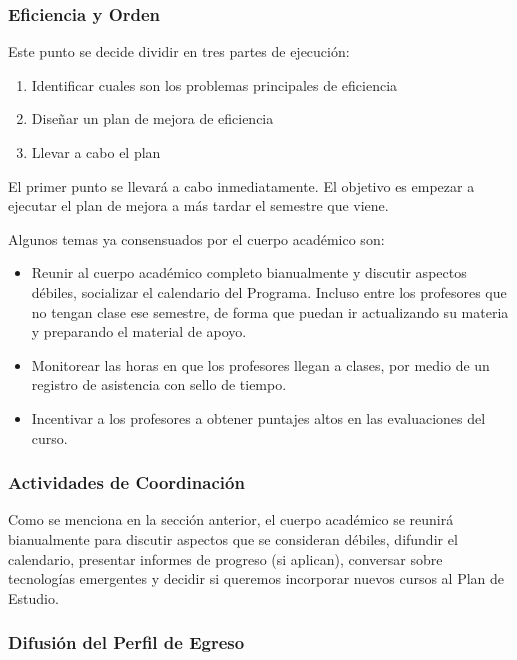 \subsubsection{Eficiencia y Orden}
\label{eficiencia_orden}

Este punto se decide dividir en tres partes de ejecución:

\begin{enumerate}
\item Identificar cuales son los problemas principales de eficiencia
\item Diseñar un plan de mejora de eficiencia
\item Llevar a cabo el plan 
\end{enumerate}

El primer punto se llevará a cabo inmediatamente. El objetivo es empezar a ejecutar el plan de mejora a más tardar el semestre que viene.

Algunos temas ya consensuados por el cuerpo académico son: 

\begin{itemize}
\item Reunir al cuerpo académico completo bianualmente y discutir aspectos débiles, socializar el calendario del Programa. Incluso entre los profesores que no tengan clase ese semestre, de forma que puedan ir actualizando su materia y preparando el material de apoyo.
\item Monitorear las horas en que los profesores llegan a clases, por medio de un registro de asistencia con sello de tiempo.
\item Incentivar a los profesores a obtener puntajes altos en las evaluaciones del curso.
\end{itemize}



\subsubsection{Actividades de Coordinación}

Como se menciona en la sección anterior, el cuerpo académico se reunirá bianualmente para discutir aspectos que se consideran débiles, difundir el calendario, presentar informes de progreso (si aplican), conversar sobre tecnologías emergentes y decidir si queremos incorporar nuevos cursos al Plan de Estudio.


\subsubsection{Difusión del Perfil de Egreso}
\label{difusion}

